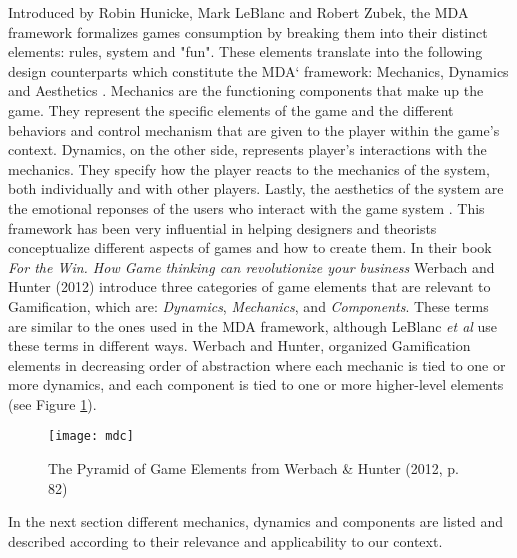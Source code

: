 Introduced by Robin Hunicke, Mark LeBlanc and Robert Zubek, the MDA framework formalizes games consumption by breaking them into their distinct elements: rules, system and "fun". These elements translate into the following design counterparts which constitute the MDA` framework: Mechanics, Dynamics and Aesthetics \cite{hunicke2004mda}. Mechanics are the functioning components that make up the game. They represent the specific elements of the game and the different behaviors and control mechanism that are given to the player within the game's context. Dynamics, on the other side, represents player’s interactions with the mechanics. They specify how the player reacts to the mechanics of the system, both individually and with other players. Lastly, the aesthetics of the system are the emotional reponses of the users who interact with the game system \cite{zichermann2011gamification}. This framework has been very influential in helping designers and theorists conceptualize different aspects of games and how to create them. In their book \textit{For the Win. How Game thinking can revolutionize your business} Werbach and Hunter (2012) introduce three categories of game elements that are relevant to Gamification, which are: \textit{Dynamics}, \textit{Mechanics}, and \textit{Components}. These terms are similar to the ones used in the MDA framework, although LeBlanc \textit{et al} use these terms in different ways. Werbach and Hunter, organized Gamification elements in decreasing order of abstraction where each mechanic is tied to one or more dynamics, and each component is tied to one or more higher-level elements (see Figure \ref{fig:mdc}).
\begin{figure}[h]
    \centering
    \texttt{[image: mdc]}
    \caption{The Pyramid of Game Elements from Werbach \& Hunter (2012, p. 82)}
    \label{fig:mdc}
\end{figure}
In the next section different mechanics, dynamics and components are listed and described according to their relevance and applicability to our context.
